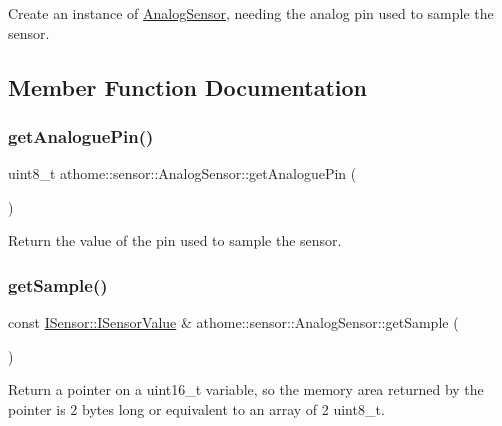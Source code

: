 Create an instance of \mbox{\hyperlink{classathome_1_1sensor_1_1_analog_sensor}{Analog\+Sensor}}, needing the analog pin used to sample the sensor. 

\subsection{Member Function Documentation}
\mbox{\label{classathome_1_1sensor_1_1_analog_sensor_ac4eab6ad6117e8e6689f9e1d9fb05015}} 
\subsubsection{\texorpdfstring{get\+Analogue\+Pin()}{getAnaloguePin()}}
{\footnotesize\ttfamily uint8\+\_\+t athome\+::sensor\+::\+Analog\+Sensor\+::get\+Analogue\+Pin (\begin{DoxyParamCaption}{ }\end{DoxyParamCaption})}

Return the value of the pin used to sample the sensor. \mbox{\label{classathome_1_1sensor_1_1_analog_sensor_a7ad00f985a9d1abeb64f973b5d16558c}} 
\subsubsection{\texorpdfstring{get\+Sample()}{getSample()}}
{\footnotesize\ttfamily const \mbox{\hyperlink{structathome_1_1sensor_1_1_i_sensor_1_1_i_sensor_value}{I\+Sensor\+::\+I\+Sensor\+Value}} \& athome\+::sensor\+::\+Analog\+Sensor\+::get\+Sample (\begin{DoxyParamCaption}{ }\end{DoxyParamCaption})\hspace{0.3cm}{\ttfamily [virtual]}}

Return a pointer on a {\ttfamily uint16\+\_\+t} variable, so the memory area returned by the pointer is 2 bytes long or equivalent to an array of 2 {\ttfamily uint8\+\_\+t}.

